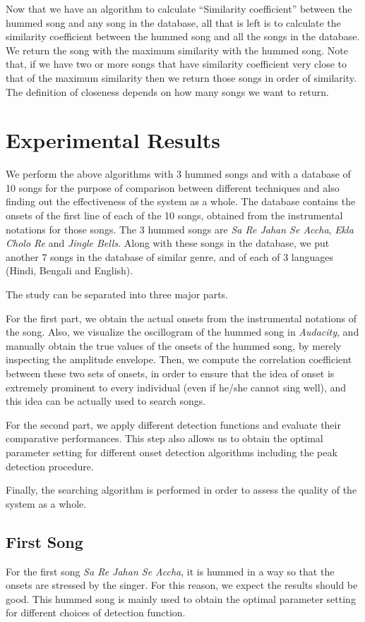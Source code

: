\documentclass[10pt]{article}
\begin{document}
Now that we have an algorithm to calculate “Similarity coefficient” between the hummed song and any song in the database, all that is left is to calculate the similarity coefficient between the hummed song and all the songs in the database. We return the song with the maximum similarity with the hummed song. 
Note that, if we have two or more songs that have similarity coefficient very close to that of the maximum similarity then we return those songs in order of similarity. The definition of closeness depends on how many songs we want to return.




\section{Experimental Results}
\qquad We perform the above algorithms with 3 hummed songs and with a database of 10 songs for the purpose of comparison between different techniques and also finding out the effectiveness of the system as a whole. The database contains the onsets of the first line of each of the 10 songs, obtained from the instrumental notations for those songs. The 3 hummed songs are \textit{Sa Re Jahan Se Accha}, \textit{Ekla Cholo Re} and \textit{Jingle Bells}. Along with these songs in the database, we put another 7 songs in the database of similar genre, and of each of 3 languages (Hindi, Bengali and English).  

The study can be separated into three major parts.

For the first part, we obtain the actual onsets from the instrumental notations of the song. Also, we visualize the oscillogram of the hummed song in \textit{Audacity}, and manually obtain the true values of the onsets of the hummed song, by merely inspecting the amplitude envelope. Then, we compute the correlation coefficient between these two sets of onsets, in order to ensure that the idea of onset is extremely prominent to every individual (even if he/she cannot sing well), and this idea can be actually used to search songs.

For the second part, we apply different detection functions and evaluate their comparative performances. This step also allows us to obtain the optimal parameter setting for different onset detection algorithms including the peak detection procedure.

Finally, the searching algorithm is performed in order to assess the quality of the system as a whole. 


\subsection{First Song}
\qquad For the first song \textit{Sa Re Jahan Se Accha}, it is hummed in a way so that the onsets are stressed by the singer. For this reason, we expect the results should be good. This hummed song is mainly used to obtain the optimal parameter setting for different choices of detection function.
\end{document}
